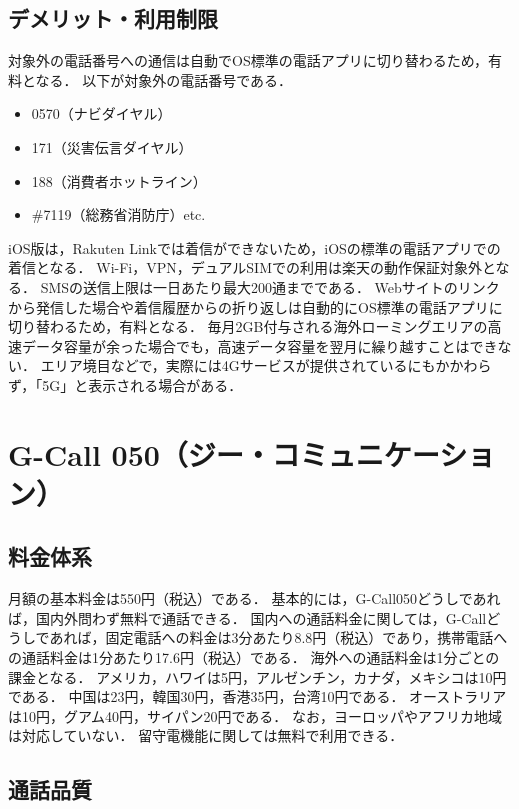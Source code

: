 \documentclass[a4paper,12pt]{article}
\begin{document}
\subsection{デメリット・利用制限}

対象外の電話番号への通信は自動でOS標準の電話アプリに切り替わるため，有料となる．
以下が対象外の電話番号である．
\begin{itemize}
  \item 0570（ナビダイヤル）
  \item 171（災害伝言ダイヤル）
  \item 188（消費者ホットライン）
  \item \#7119（総務省消防庁）etc.
\end{itemize}
iOS版は，Rakuten Linkでは着信ができないため，iOSの標準の電話アプリでの着信となる．
Wi-Fi，VPN，デュアルSIMでの利用は楽天の動作保証対象外となる．
SMSの送信上限は一日あたり最大200通までである．
Webサイトのリンクから発信した場合や着信履歴からの折り返しは自動的にOS標準の電話アプリに切り替わるため，有料となる．
毎月2GB付与される海外ローミングエリアの高速データ容量が余った場合でも，高速データ容量を翌月に繰り越すことはできない．
エリア境目などで，実際には4Gサービスが提供されているにもかかわらず，「5G」と表示される場合がある．

\section{G-Call 050（ジー・コミュニケーション）}\cite{gcall050-service}

\subsection{料金体系}

月額の基本料金は550円（税込）である．
基本的には，G-Call050どうしであれば，国内外問わず無料で通話できる．
国内への通話料金に関しては，G-Callどうしであれば，固定電話への料金は3分あたり8.8円（税込）であり，携帯電話への通話料金は1分あたり17.6円（税込）である．
海外への通話料金は1分ごとの課金となる．
アメリカ，ハワイは5円，アルゼンチン，カナダ，メキシコは10円である．
中国は23円，韓国30円，香港35円，台湾10円である．
オーストラリアは10円，グアム40円，サイパン20円である．
なお，ヨーロッパやアフリカ地域は対応していない．
留守電機能に関しては無料で利用できる．

\subsection{通話品質}
\end{document}
